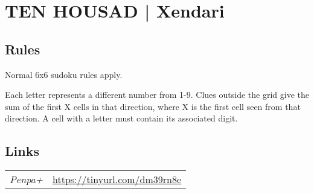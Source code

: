 \section{TEN HOUSAD | {\normalfont Xendari}}
\label{sec:08-ten-housad-xendari}

\subsection*{Rules}
\begin{markdown}
Normal 6x6 sudoku rules apply.

Each letter represents a different number from 1-9. Clues outside the grid give the sum of the first X cells in that direction, where X is the first cell seen from that direction. A cell with a letter must contain its associated digit.
\end{markdown}
\subsection*{Links}
\begin{tabularx}{\textwidth}{l X}
\emph{Penpa+} & \url{https://tinyurl.com/dm39rn8e} \\
\end{tabularx}
\pagebreak
